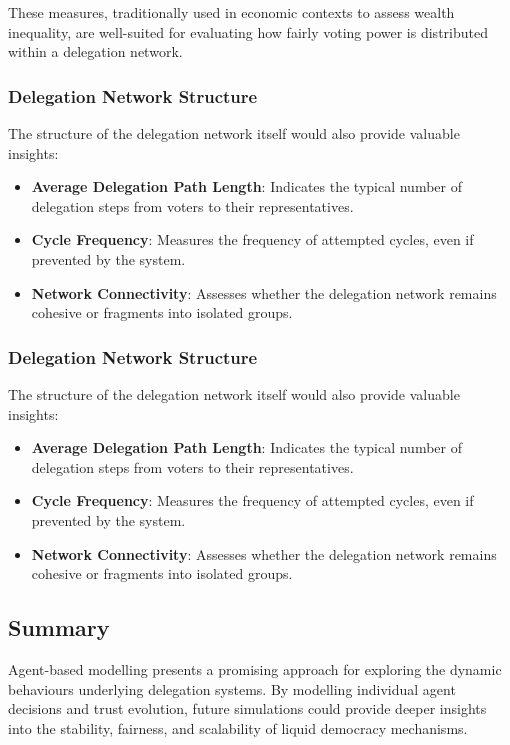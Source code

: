 These measures, traditionally used in economic contexts to assess wealth inequality, are well-suited for evaluating how fairly voting power is distributed within a delegation network.

\subsubsection{Delegation Network Structure}

The structure of the delegation network itself would also provide valuable insights:

\begin{itemize}
    \item \textbf{Average Delegation Path Length}: Indicates the typical number of delegation steps from voters to their representatives.
    \item \textbf{Cycle Frequency}: Measures the frequency of attempted cycles, even if prevented by the system.
    \item \textbf{Network Connectivity}: Assesses whether the delegation network remains cohesive or fragments into isolated groups.
\end{itemize}

\subsubsection{Delegation Network Structure}

The structure of the delegation network itself would also provide valuable insights:

\begin{itemize}
    \item \textbf{Average Delegation Path Length}: Indicates the typical number of delegation steps from voters to their representatives.
    \item \textbf{Cycle Frequency}: Measures the frequency of attempted cycles, even if prevented by the system.
    \item \textbf{Network Connectivity}: Assesses whether the delegation network remains cohesive or fragments into isolated groups.
\end{itemize}

\subsection{Summary}

Agent-based modelling presents a promising approach for exploring the dynamic behaviours underlying delegation systems. By modelling individual agent decisions and trust evolution, future simulations could provide deeper insights into the stability, fairness, and scalability of liquid democracy mechanisms.


